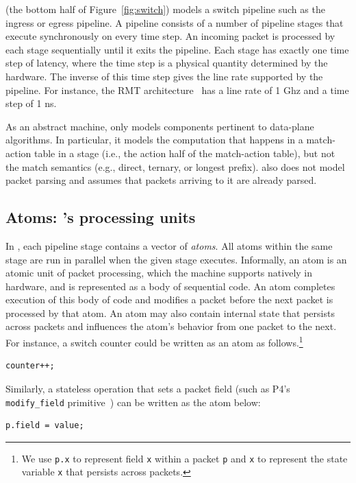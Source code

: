 \absmachine (the bottom half of Figure~\ref{fig:switch}) models a switch
pipeline such as the ingress or egress pipeline. A pipeline consists of a
number of pipeline stages that execute synchronously on every time step. An
incoming packet is processed by each stage sequentially until it exits the
pipeline. Each stage has exactly one time step of latency, where the time step
is a physical quantity determined by the hardware. The inverse of this time
step gives the line rate supported by the pipeline. For instance, the RMT
architecture~\cite{rmt} has a line rate of 1 Ghz and a time step of 1 ns.

As an abstract machine, \absmachine only models components pertinent to
data-plane algorithms. In particular, it models the computation that happens in
a match-action table in a stage (i.e., the action half of the match-action
table), but not the match semantics (e.g., direct, ternary, or longest prefix).
\absmachine also does not model packet parsing and assumes that packets
arriving to it are already parsed.


\subsection{Atoms: \absmachine's processing units}

In \absmachine, each pipeline stage contains a vector of \textit{atoms}. All
atoms within the same stage are run in parallel when the given stage executes.
Informally, an atom is an atomic unit of packet processing, which the
\absmachine machine supports natively in hardware, and is represented as a body
of sequential code. An atom completes execution of this body of code and
modifies a packet before the next packet is processed by that atom.  An atom
may also contain internal state that persists across packets and influences the
atom's behavior from one packet to the next.  For instance, a switch counter
could be written as an atom as follows.\footnote{We use {\tt p.x} to represent
  field {\tt x} within a packet {\tt p} and {\tt x} to represent the state
variable {\tt x} that persists across packets.}
  \begin{lstlisting}[style=customc, numbers=none, frame=none]
  counter++;
  \end{lstlisting}
Similarly, a stateless operation that sets a packet field (such as P4's {\tt
modify\_field} primitive~\cite{p4spec}) can be written as the atom below:
\begin{lstlisting}[style=customc, numbers=none, frame=none]
  p.field = value;
\end{lstlisting}

